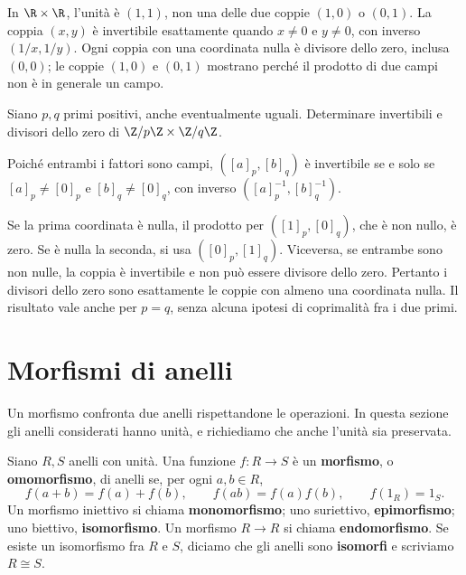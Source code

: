 \begin{esempio}
In $\R\times\R$, l'unità è $(1,1)$, non una delle due coppie $(1,0)$ o $(0,1)$. La coppia $(x,y)$ è invertibile esattamente quando $x\ne0$ e $y\ne0$, con inverso $(1/x,1/y)$. Ogni coppia con una coordinata nulla è divisore dello zero, inclusa $(0,0)$; le coppie $(1,0)$ e $(0,1)$ mostrano perché il prodotto di due campi non è in generale un campo.
\end{esempio}

\begin{esercizio}
Siano $p,q$ primi positivi, anche eventualmente uguali. Determinare invertibili e divisori dello zero di $\Z/p\Z\times\Z/q\Z$.
\end{esercizio}
\begin{svolgimento}
Poiché entrambi i fattori sono campi, $([a]_p,[b]_q)$ è invertibile se e solo se $[a]_p\ne[0]_p$ e $[b]_q\ne[0]_q$, con inverso $([a]_p^{-1},[b]_q^{-1})$.

Se la prima coordinata è nulla, il prodotto per $([1]_p,[0]_q)$, che è non nullo, è zero. Se è nulla la seconda, si usa $([0]_p,[1]_q)$. Viceversa, se entrambe sono non nulle, la coppia è invertibile e non può essere divisore dello zero. Pertanto i divisori dello zero sono esattamente le coppie con almeno una coordinata nulla. Il risultato vale anche per $p=q$, senza alcuna ipotesi di coprimalità fra i due primi.
\end{svolgimento}

\section{Morfismi di anelli}
Un morfismo confronta due anelli rispettandone le operazioni. In questa sezione gli anelli considerati hanno unità, e richiediamo che anche l'unità sia preservata.

\begin{definizione}
Siano $R,S$ anelli con unità. Una funzione $f:R\to S$ è un \textbf{morfismo}, o \textbf{omomorfismo}, di anelli se, per ogni $a,b\in R$,
\[
f(a+b)=f(a)+f(b),\qquad f(ab)=f(a)f(b),\qquad f(1_R)=1_S.
\]
Un morfismo iniettivo si chiama \textbf{monomorfismo}; uno suriettivo, \textbf{epimorfismo}; uno biettivo, \textbf{isomorfismo}. Un morfismo $R\to R$ si chiama \textbf{endomorfismo}. Se esiste un isomorfismo fra $R$ e $S$, diciamo che gli anelli sono \textbf{isomorfi} e scriviamo $R\cong S$.
\end{definizione}


